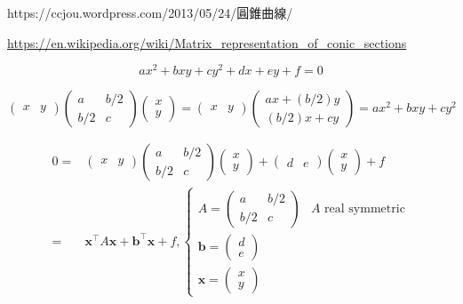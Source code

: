 \documentclass[
]{book}
\theoremstyle{definition}
\theoremstyle{definition}
\theoremstyle{definition}
\theoremstyle{definition}
\theoremstyle{remark}
\begin{document}
\begin{CJK}{UTF8}{bsmi}
https://ccjou.wordpress.com/2013/05/24/圓錐曲線/
\end{CJK}

\url{https://en.wikipedia.org/wiki/Matrix_representation_of_conic_sections}

\[
ax^{2}+bxy+cy^{2}+dx+ey+f=0
\]

\[
\begin{pmatrix}x & y\end{pmatrix}\begin{pmatrix}a & b/2\\
b/2 & c
\end{pmatrix}\begin{pmatrix}x\\
y
\end{pmatrix}=\begin{pmatrix}x & y\end{pmatrix}\begin{pmatrix}ax+\left(b/2\right)y\\
\left(b/2\right)x+cy
\end{pmatrix}=ax^{2}+bxy+cy^{2}
\]

\[
\begin{aligned}
0= & \begin{pmatrix}x & y\end{pmatrix}\begin{pmatrix}a & b/2\\
b/2 & c
\end{pmatrix}\begin{pmatrix}x\\
y
\end{pmatrix}+\begin{pmatrix}d & e\end{pmatrix}\begin{pmatrix}x\\
y
\end{pmatrix}+f\\
= & \boldsymbol{x}^{\intercal}A\boldsymbol{x}+\boldsymbol{b}^{\intercal}\boldsymbol{x}+f,\begin{cases}
A=\begin{pmatrix}a & b/2\\
b/2 & c
\end{pmatrix} & A\text{ real symmetric}\\
\boldsymbol{b}=\begin{pmatrix}d\\
e
\end{pmatrix}\\
\boldsymbol{x}=\begin{pmatrix}x\\
y
\end{pmatrix}
\end{cases}
\end{aligned}
\]
\end{document}
